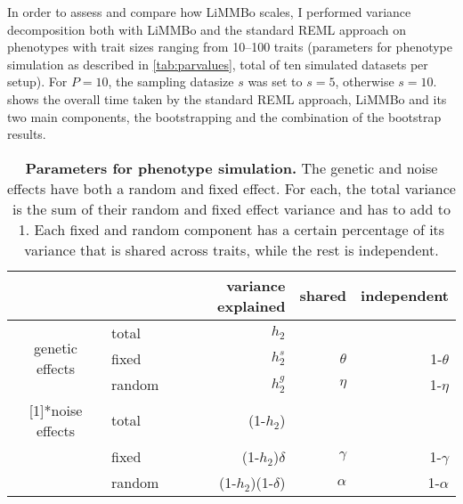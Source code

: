 In order to assess and compare how LiMMBo scales, I performed variance decomposition both with LiMMBo and the standard REML approach on phenotypes with trait sizes ranging from \numrange{10}{100} traits (parameters for phenotype simulation as described in \cref{tab:parvalues}, total of ten simulated datasets per setup). For \(P=10\), the sampling datasize \(s\) was set to \(s=5\), otherwise  \(s=10\).   shows the overall time taken by the standard REML approach, LiMMBo and its two main components, the bootstrapping and the combination of the bootstrap results.
\begin{table}[htbp]
  \centering
  \caption[\textbf{Parameters for phenotype simulation.}]{\textbf{Parameters for phenotype simulation.} The genetic and noise effects have both a random and fixed effect. For each, the total variance is the sum of their random and fixed effect variance and has to add to 1. Each fixed and random component has a certain percentage of its variance that is shared across traits, while the rest is independent.}
    \begin{tabular}{clrrr}
    \toprule
          &       & variance explained & shared & independent \\
    \midrule
    \multirow{3}[1]{*}{genetic effects} & total & \(h_2\) &       &  \\
          & fixed & \(h_2^s\) & \(\theta\) & 1-\(\theta\) \\
          & random & \(h_2^g\) & \(\eta\) & 1-\(\eta\) \\
   \addlinespace[1.5ex]
    \multirow{3}[1]{*}{noise effects} & total & (1-\(h_2\)) &       &  \\
          & fixed & (1-\(h_2\))\(\delta\) & \(\gamma\) & 1-\(\gamma\) \\
          & random & (1-\(h_2\))(1-\(\delta\)) & \(\alpha\) & 1-\(\alpha\) \\
    \bottomrule
    \end{tabular}%
  \label{tab:pardescription}%
\end{table}%
%
